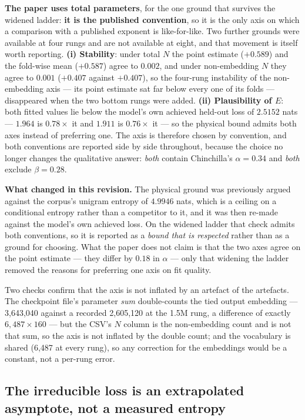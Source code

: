 \documentclass[11pt,a4paper]{article}
\begin{document}
\textbf{The paper uses total parameters}, for the one ground that survives the
widened ladder: \textbf{it is the published convention}, so it is the only axis
on which a comparison with a published exponent is like-for-like. Two further
grounds were available at four rungs and are not available at eight, and that
movement is itself worth reporting. \textbf{(i) Stability}: under total $N$ the
point estimate ($+0.589$) and the fold-wise mean ($+0.587$) agree to $0.002$,
and under non-embedding $N$ they agree to $0.001$ ($+0.407$ against $+0.407$),
so the four-rung instability of the non-embedding axis --- its point estimate
sat far below every one of its folds --- disappeared when the two bottom rungs
were added. \textbf{(ii) Plausibility of $E$}: both fitted values lie below the
model's own achieved held-out loss of $2.5152$ nats --- $1.964$ is
$0.78\times$ it and $1.911$ is $0.76\times$ it --- so the physical bound admits
both axes instead of preferring one. The axis is therefore chosen by
convention, and both conventions are reported side by side throughout, because
the choice no longer changes the qualitative answer: \emph{both} contain
Chinchilla's $\alpha = 0.34$ and \emph{both} exclude $\beta = 0.28$.

\textbf{What changed in this revision.} The physical ground was previously
argued against the corpus's unigram entropy of $4.9946$ nats, which is a
ceiling on a conditional entropy rather than a competitor to it, and it was
then re-made against the model's own achieved loss. On the widened ladder that
check admits both conventions, so it is reported as a \emph{bound that is
respected} rather than as a ground for choosing. What the paper does not claim
is that the two axes agree on the point estimate --- they differ by $0.18$ in
$\alpha$ --- only that widening the ladder removed the reasons for preferring
one axis on fit quality. %

Two checks confirm that the axis is not inflated by an artefact of the
artefacts. The checkpoint file's parameter \emph{sum} double-counts the tied
output embedding --- 3,643,040 against a recorded 2,605,120 at the 1.5M rung,
a difference of exactly $6{,}487 \times 160$ --- but the CSV's $N$ column is
the non-embedding count and is not that sum, so the axis is not inflated by the
double count; and the vocabulary is shared (6,487 at every rung), so any
correction for the embeddings would be a constant, not a per-rung error.

\subsection{The irreducible loss is an extrapolated asymptote, not a measured entropy}
\label{sec:act4-entropy}
\end{document}
